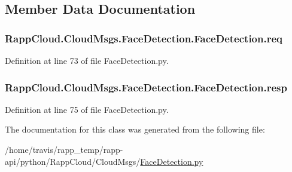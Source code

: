 \subsection{Member Data Documentation}
\hypertarget{classRappCloud_1_1CloudMsgs_1_1FaceDetection_1_1FaceDetection_a98c24136bc0f0dc81dc5803d88908bd7}{
\subsubsection[{req}]{\setlength{\rightskip}{0pt plus 5cm}Rapp\-Cloud.\-Cloud\-Msgs.\-Face\-Detection.\-Face\-Detection.\-req}}\label{classRappCloud_1_1CloudMsgs_1_1FaceDetection_1_1FaceDetection_a98c24136bc0f0dc81dc5803d88908bd7}


Definition at line 73 of file Face\-Detection.\-py.

\hypertarget{classRappCloud_1_1CloudMsgs_1_1FaceDetection_1_1FaceDetection_aff94930d54bef0a230259eda491c3f7a}{
\subsubsection[{resp}]{\setlength{\rightskip}{0pt plus 5cm}Rapp\-Cloud.\-Cloud\-Msgs.\-Face\-Detection.\-Face\-Detection.\-resp}}\label{classRappCloud_1_1CloudMsgs_1_1FaceDetection_1_1FaceDetection_aff94930d54bef0a230259eda491c3f7a}


Definition at line 75 of file Face\-Detection.\-py.



The documentation for this class was generated from the following file\-:\begin{DoxyCompactItemize}
\item 
/home/travis/rapp\-\_\-temp/rapp-\/api/python/\-Rapp\-Cloud/\-Cloud\-Msgs/\hyperlink{FaceDetection_8py}{Face\-Detection.\-py}\end{DoxyCompactItemize}
